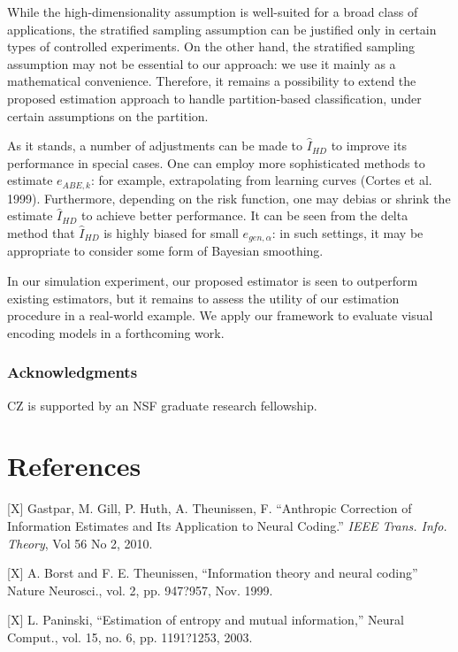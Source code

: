\documentclass{article}
\begin{document}
While the high-dimensionality assumption is well-suited for a broad class of applications,
the stratified sampling assumption can be justified only in certain types of controlled experiments.
On the other hand, the stratified sampling assumption may not be essential to our approach:
we use it mainly as a mathematical convenience.  Therefore, it remains a possibility to
extend the proposed estimation approach to handle partition-based classification, under certain assumptions
on the partition.

As it stands, a number of adjustments can be made to $\hat{I}_{HD}$ to improve
its performance in special cases.  One can employ more sophisticated methods to
estimate $e_{ABE, k}$: for example, extrapolating from learning curves (Cortes et al. 1999).
Furthermore, depending on the risk function, one may debias or shrink the estimate $\hat{I}_{HD}$
to achieve better performance.  It can be seen from the delta method that $\hat{I}_{HD}$ is
highly biased for small $e_{gen, \alpha}$: in such settings, it may be appropriate to consider
some form of Bayesian smoothing.

In our simulation experiment, our proposed estimator is seen to outperform existing
estimators, but it remains to assess the utility of our estimation
procedure in a real-world example.  We apply our framework to evaluate visual encoding models
in a forthcoming work.

\subsubsection*{Acknowledgments}

CZ is supported by an NSF graduate research fellowship.

\section*{References}

\small

[X] Gastpar, M.  Gill, P.  Huth, A.  Theunissen, F. ``Anthropic Correction of Information Estimates and Its Application to Neural Coding.'' \emph{IEEE Trans. Info. Theory}, Vol 56 No 2, 2010.

[X] A. Borst and F. E. Theunissen, ``Information theory and neural coding''
Nature Neurosci., vol. 2, pp. 947?957, Nov. 1999.

[X] L. Paninski, ``Estimation of entropy and mutual information,'' Neural
Comput., vol. 15, no. 6, pp. 1191?1253, 2003.
\end{document}
